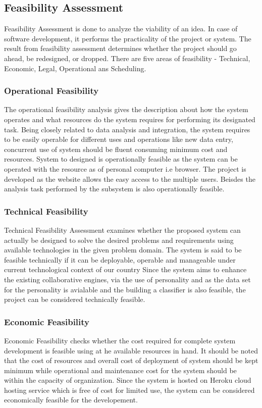 \subsection{Feasibility Assessment}
Feasibility Assessment is done to analyze the viability of an idea. In case of software development, it performs the practicality of the project or system. The result from feasibility assessment determines whether the project should go ahead, be redesigned, or dropped. There are
five areas of feasibility - Technical, Economic, Legal, Operational ans Scheduling.

\subsubsection{Operational Feasibility}

The operational feasibility analysis gives the description about how the system operates and what resources do the system requires for performing its designated task. Being closely related to data analysis and integration, the system requires to be easily operable for different uses and operations like new data entry, concurrent use of system should be fluent consuming minimum cost and resources.
System to designed is operationally feasible as the system can be operated with the resource as of personal computer i.e browser. The project is developed as the website allows the easy access to the multiple  users. Beisdes the analysis task performed by the subsystem is also operationally feasible.

\subsubsection{Technical Feasibility}
Technical Feasibility Assessment examines whether the proposed system can actually be designed to solve the desired problems and requirements using available technologies in the given problem domain. The system is said to be feasible technically if it can be deployable, operable and manageable under current technological context of our country
Since the system aims to enhance the existing collaborative engines, via the use of personality and as the data set for the personality is avialable and the building a classifier is also feasible, the project can be considered technically feasible.

\subsubsection{Economic Feasibility}
Economic Feasibility checks whether the cost required for complete system development is feasible using at he available resources in hand. It should be noted that the cost of resources and overall cost of deployment of system should be kept minimum while operational and maintenance cost for the system should be within the capacity of organization.
Since the system is hosted on Heroku cloud hosting service which is free of cost for limited use, the system can be considered economically feasible for the developement.


